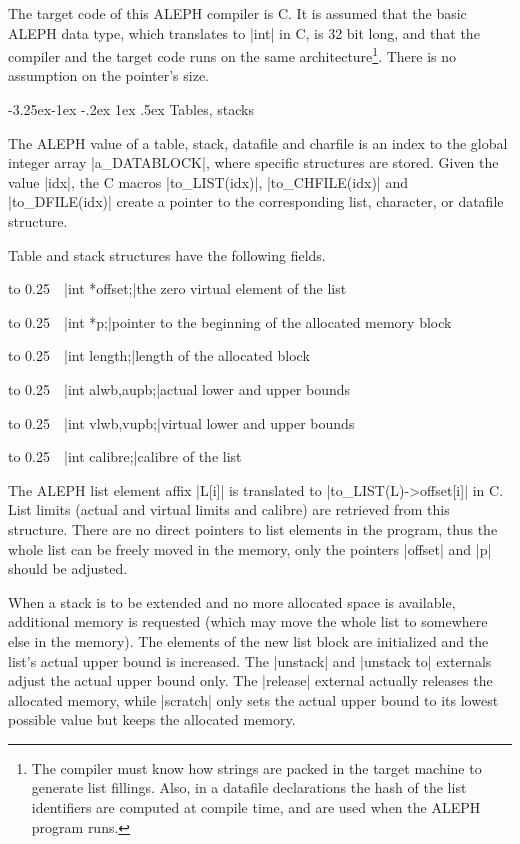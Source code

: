 \documentclass{article}
\makeatletter
\newcommand\A{{\sf ALEPH}}
\newcommand\g[1]{{\sf #1}}
\renewcommand\subsection{%
\@startsection{subsection}{2}{\z@}%
   {-3.25ex\@plus -1ex \@minus -.2ex}%
   {1ex \@plus .5ex}%
   {\normalfont\normalsize\bfseries}}
\makeatother
\begin{document}
The target code of this \A{} compiler is {\sf C}. It is assumed that the
basic \A{} data type, which translates to \pp|int| in {\sf C}, is 32 bit long,
and that the compiler and the target code runs on the same
architecture\footnote{The compiler must know how strings are packed in the
target machine to generate list fillings. Also, in a datafile declarations the
hash of the list identifiers are computed at compile
time, and are used when the \A{} program runs.}. There is no assumption on
the pointer's size.

\subsection{Tables, stacks}\label{subsec:tables-stacks}

The \A{} value of a \g{table}, \g{stack}, \g{datafile} and \g{charfile} is
an index to the global integer array \pp|a\_DATABLOCK|, where specific 
structures are stored. Given the value \pp|idx|, the {\sf C} macros
\pp|to\_LIST(idx)|, \pp|to\_CHFILE(idx)| and \pp|to\_DFILE(idx)| create a
pointer to the corresponding list, character, or datafile structure.

Table and stack structures have the following fields.
\def\HH{\noindent\hbox to 0.25\linewidth\bgroup~~}

\medskip

\HH\pp|int *offset;|\HE the zero virtual element of the list

\HH\pp|int *p;|\HE  pointer to the beginning of the allocated memory block

\HH\pp|int length;|\HE length of the allocated block

\HH\pp|int alwb,aupb;|\HE actual lower and upper bounds

\HH\pp|int vlwb,vupb;|\HE virtual lower and upper bounds

\HH\pp|int calibre;|\HE  calibre of the list

\smallskip
\noindent
The \A{} list element affix \pp|L[i]| is translated to \pp|to\_LIST(L)->offset[i]|
in {\sf C}. List limits (actual and virtual limits and calibre) are
retrieved from this structure. There are no direct pointers to list elements
in the program, thus the whole list can be freely moved in the memory, only the
pointers \pp|offset| and \pp|p| should be adjusted.

When a stack is to be extended and no more allocated space is available,
additional memory is requested (which may move the whole list to somewhere
else in the memory). The elements of the new list block are initialized
and the list's actual upper bound is increased. The \pp|unstack| and
\pp|unstack to| externals adjust the actual upper bound only. The
\pp|release| external actually releases the allocated memory, while
\pp|scratch| only sets the actual upper bound to its lowest possible value
but keeps the allocated memory.
\end{document}
